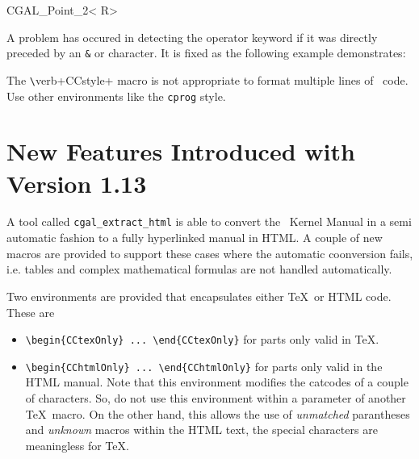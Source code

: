 \documentclass[12pt]{article}
\begin{document}
\begin{classtemplate}{CGAL_Point_2< R>}
\end{classtemplate}

A problem has occured in detecting the operator keyword if it was
directly preceded by an {\tt \&} or {\tt *} character. It is fixed as
the following example demonstrates:


%
%

The \verb+\+verb+CCstyle+ macro is not appropriate to format multiple lines
of \CC\ code. Use other environments like the {\tt cprog} style.


\section{New Features Introduced with Version 1.13}

A tool called {\tt cgal\_extract\_html} is able to convert the \cgal\
Kernel Manual in a semi automatic fashion to a fully hyperlinked
manual in HTML. A couple of new macros are provided to support these
cases where the automatic coonversion fails, i.e. tables and complex
mathematical formulas are not handled automatically.

Two environments are provided that encapsulates either \TeX\ or HTML
code. These are 

\begin{itemize}
    \item
        \verb+\begin{CCtexOnly} ... \end{CCtexOnly}+ for parts only valid
        in \TeX.
    \item
        \verb+\begin{CChtmlOnly} ... \end{CChtmlOnly}+ for parts only valid
        in the HTML manual. Note that this environment modifies the 
        catcodes of a couple of characters. So, do not use this
        environment within a parameter of another \TeX\ macro. On the
        other hand, this allows the use of {\em unmatched} parantheses
        and {\em unknown} macros within the HTML text, the special
        characters are meaningless for \TeX.
\end{itemize}
\end{document}
